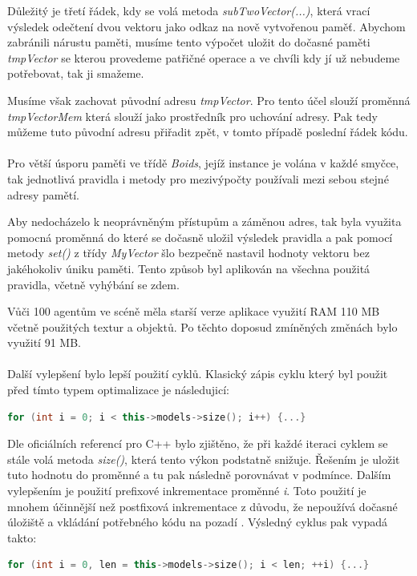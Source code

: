 \documentclass[czech,public,dept460,male,cpdeclaration]{diploma}
\begin{document}
Důležitý je třetí řádek, kdy se volá metoda \textit{subTwoVector(...)}, která vrací výsledek odečtení dvou vektoru jako odkaz na nově vytvořenou paměť. Abychom zabránili nárustu paměti, musíme tento výpočet uložit do dočasné paměti \textit{tmpVector} se kterou provedeme patřičné operace a ve chvíli kdy jí už nebudeme potřebovat, tak ji smažeme.

Musíme však zachovat původní adresu \textit{tmpVector}. Pro tento účel slouží proměnná \\\textit{tmpVectorMem} která slouží jako prostředník pro uchování adresy. Pak tedy můžeme tuto původní adresu přiřadit zpět, v tomto případě poslední řádek kódu.
\\\\
Pro větší úsporu paměťi ve třídě \textit{Boids}, jejíž instance je volána v každé smyčce, tak jednotlivá pravidla i metody pro mezivýpočty používali mezi sebou stejné adresy pamětí.

Aby nedocházelo k neoprávněným přístupům a záměnou adres, tak byla využita pomocná proměnná do které se dočasně uložil výsledek pravidla a pak pomocí metody \textit{set()} z třídy \textit{MyVector} šlo bezpečně nastavil hodnoty vektoru bez jakéhokoliv úniku paměti. Tento způsob byl aplikován na všechna použitá pravidla, včetně vyhýbání se zdem.

Vůči 100 agentům ve scéně měla starší verze aplikace využití RAM 110 MB včetně použitých textur a objektů. Po těchto doposud zmíněných změnách bylo využití 91 MB.
\\\\
Další vylepšení bylo lepší použití cyklů. Klasický zápis cyklu který byl použit před tímto typem optimalizace je následujicí:
\begin{lstlisting}[language=c++,label=src:classic cycle,caption=Použití klasického cyklu] 
for (int i = 0; i < this->models->size(); i++) {...}
\end{lstlisting}
Dle oficiálních referencí pro C++ \cite{linkToCppReference} bylo zjištěno, že při každé iteraci cyklem se stále volá metoda \textit{size()}, která tento výkon podstatně snižuje. Řešením je uložit tuto hodnotu do proměnné a tu pak  následně porovnávat v podmínce. Dalším vylepšením je použití prefixové inkrementace proměnné \textit{i}. Toto použití je mnohem účinnější než postfixová inkrementace z důvodu, že nepoužívá dočasné úložiště a vkládání potřebného kódu na pozadí \cite{linkToPreIncrementation}. Výsledný cyklus pak vypadá takto:
\begin{lstlisting}[language=c++,label=src:optimalized cycle,caption=Použití optimalizovaného cyklu] 
for (int i = 0, len = this->models->size(); i < len; ++i) {...}
\end{lstlisting}
\end{document}

